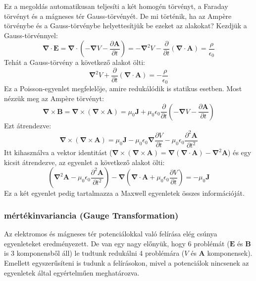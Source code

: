 \documentclass[../main.tex]{subfiles}
\begin{document}
Ez a megoldás automatikusan teljesíti a két homogén törvényt, a Faraday törvényt és a mágneses tér Gauss-törvényét. De mi történik, ha az Ampère törvénybe és a Gauss-törvénybe helyettesítjük be ezeket az alakokat?
Kezdjük a Gauss-törvénnyel:
\begin{equation}
    \boldsymbol{\nabla} \cdot \mathbf{E} = \boldsymbol{\nabla} \cdot \left( - \boldsymbol{\nabla} V - \frac{\partial \mathbf{A}}{\partial t} \right) = - \boldsymbol{\nabla}^2 V - \frac{\partial }{\partial t} (\boldsymbol{\nabla} \cdot \mathbf{A}) = \frac{\rho}{\epsilon_0}
\end{equation}
Tehát a Gauss-törvény a következő alakot ölti:
\begin{equation}
    \boxed{\boldsymbol{\nabla}^2 V + \frac{\partial }{\partial t} (\boldsymbol{\nabla} \cdot \mathbf{A}) = - \frac{\rho}{\epsilon_0}}
\end{equation}
Ez a Poisson-egyenlet megfelelője, amire redukálódik is statikus esetben. Most nézzük meg az Ampère törvényt:
\begin{equation}
    \boldsymbol{\nabla} \times \mathbf{B} = \boldsymbol{\nabla} \times (\boldsymbol{\nabla} \times \mathbf{A}) = \mu_0 \mathbf{J} + \mu_0 \epsilon_0 \frac{\partial }{\partial t} \left( - \boldsymbol{\nabla} V - \frac{\partial \mathbf{A}}{\partial t} \right)
\end{equation}
Ezt átrendezve:
\begin{equation}
    \boldsymbol{\nabla} \times (\boldsymbol{\nabla} \times \mathbf{A}) = \mu_0 \mathbf{J} - \mu_0 \epsilon_0 \boldsymbol{\nabla} \frac{\partial V}{\partial t} - \mu_0 \epsilon_0 \frac{\partial^2 \mathbf{A}}{\partial t^2}
\end{equation}
Itt kihasználva a vektor identitást ($\boldsymbol{\nabla} \times (\boldsymbol{\nabla} \times \mathbf{A}) = \boldsymbol{\nabla} (\boldsymbol{\nabla} \cdot \mathbf{A}) - \boldsymbol{\nabla}^2 \mathbf{A}$) és egy kicsit átrendezve, az egyenlet a következő alakot ölti:
\begin{equation}
    \boxed{\left(\boldsymbol{\nabla}^2 \mathbf{A} - \mu_0 \epsilon_0 \frac{\partial^2 \mathbf{A}}{\partial t^2}\right) - \boldsymbol{\nabla} \left(\boldsymbol{\nabla} \cdot \mathbf{A} + \mu_0 \epsilon_0 \frac{\partial V}{\partial t}\right) = - \mu_0 \mathbf{J}}
\end{equation}
Ez a két egyenlet pedig tartalmazza a Maxwell egyenletek összes információját.

\subsubsection{mértékinvariancia (Gauge Transformation)}
Az elektromos és mágneses tér potenciálokkal való felírása elég csúnya egyenleteket eredményezett. De van egy nagy előnyük, hogy 6 problémát ($\mathbf{E}$ és $\mathbf{B}$ is 3 komponensből áll) le tudtunk redukálni 4 problémára ($V$ és $\mathbf{A}$ komponensek).
Emellett egyszerűsíteni is tudunk a felírásokon, mivel a potenciálok nincsenek az egyenletek által egyértelműen meghatározva. 
\end{document}
